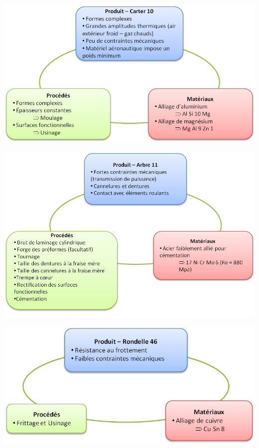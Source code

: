 \documentclass[11pt,oneside]{article}
\begin{document}
\begin{minipage}[c]{.45\linewidth}
\begin{center}
\includegraphics[width=.95\textwidth]{png/10}
\end{center}
\end{minipage} \hfill
\begin{minipage}[c]{.45\linewidth}
\begin{center}
\includegraphics[width=.95\textwidth]{png/11}
\end{center}
\end{minipage}

\begin{center}
\includegraphics[width=.45\textwidth]{png/46}
\end{center}
\end{document}
